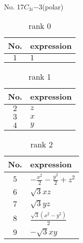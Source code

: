 \documentclass[fleqn,8pt,landscape]{jsarticle}
\begin{document}
\setcounter{MaxMatrixCols}{16}

\begin{center}
\LARGE
No. 17\quad$C_{3i}$\quad$-3$\quad[ trigonal ] (polar)
\end{center}
\begin{table}[ht!]
\begin{center}
\caption{rank 0}
\renewcommand{\arraystretch}{1.3}
\begin{tabular}{cl} \hline \hline
No. & expression \\ \hline
$ 1 $ & $ 1 $ \\
 \hline \hline
\end{tabular}
\end{center}
\end{table}
\begin{table}[ht!]
\begin{center}
\caption{rank 1}
\renewcommand{\arraystretch}{1.3}
\begin{tabular}{cl} \hline \hline
No. & expression \\ \hline
$ 2 $ & $ z $ \\
$ 3 $ & $ x $ \\
$ 4 $ & $ y $ \\
 \hline \hline
\end{tabular}
\end{center}
\end{table}
\begin{table}[ht!]
\begin{center}
\caption{rank 2}
\renewcommand{\arraystretch}{1.3}
\begin{tabular}{cl} \hline \hline
No. & expression \\ \hline
$ 5 $ & $ - \frac{x^{2}}{2} - \frac{y^{2}}{2} + z^{2} $ \\
$ 6 $ & $ \sqrt{3} x z $ \\
$ 7 $ & $ \sqrt{3} y z $ \\
$ 8 $ & $ \frac{\sqrt{3} \left(x^{2} - y^{2}\right)}{2} $ \\
$ 9 $ & $ - \sqrt{3} x y $ \\
 \hline \hline
\end{tabular}
\end{center}
\end{table}
\end{document}
